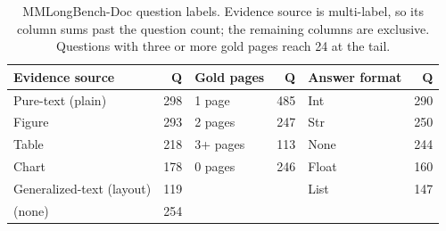 \begin{table}[h]
\centering
\small
\begin{tabular}{lr@{\hskip 2em}lr@{\hskip 2em}lr}
\toprule
Evidence source & Q & Gold pages & Q & Answer format & Q \\
\midrule
Pure-text (plain)   & 298 & 1 page  & 485 & Int   & 290 \\
Figure              & 293 & 2 pages & 247 & Str   & 250 \\
Table               & 218 & 3+ pages & 113 & None  & 244 \\
Chart               & 178 & 0 pages & 246 & Float & 160 \\
Generalized-text (layout) & 119 & & & List & 147 \\
(none)              & 254 & & & & \\
\bottomrule
\end{tabular}
\caption{MMLongBench-Doc question labels. Evidence source is multi-label, so its column sums past the question count; the remaining columns are exclusive. Questions with three or more gold pages reach 24 at the tail.}
\label{tab:mmlb_labels}
\end{table}